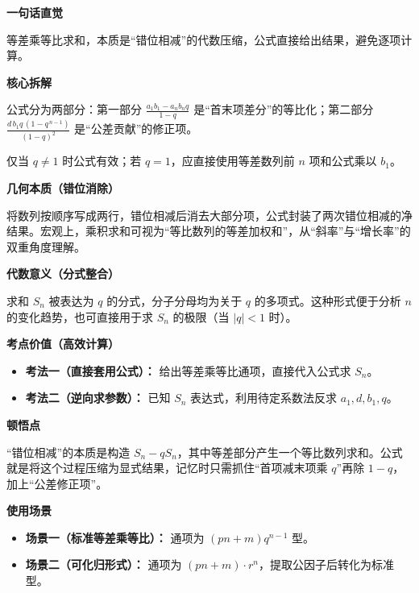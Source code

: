 \begin{explanationbox}
	\textbf{\textcolor{CExplanation}{一句话直觉}}

	等差乘等比求和，本质是“错位相减”的代数压缩，公式直接给出结果，避免逐项计算。

	\medskip
	\textbf{\textcolor{CExplanation}{核心拆解}}
	\begin{description}[style=nextline, leftmargin=2.8em, labelsep=0.5em, itemsep=0.45em]
		\item[\textbf{要点一（公式结构）：}] 公式分为两部分：第一部分 $\frac{a_1 b_1 - a_n b_n q}{1-q}$ 是“首末项差分”的等比化；第二部分 $\frac{d\,b_1 q\,(1-q^{\,n-1})}{(1-q)^2}$ 是“公差贡献”的修正项。
		\item[\textbf{要点二（适用范围）：}] 仅当 $q \neq 1$ 时公式有效；若 $q = 1$，应直接使用等差数列前 $n$ 项和公式乘以 $b_1$。
	\end{description}

	\medskip
	\textbf{\textcolor{CExplanation}{几何本质（错位消除）}}

	将数列按顺序写成两行，错位相减后消去大部分项，公式封装了两次错位相减的净结果。宏观上，乘积求和可视为“等比数列的等差加权和”，从“斜率”与“增长率”的双重角度理解。

	\medskip
	\textbf{\textcolor{CExplanation}{代数意义（分式整合）}}

	求和 $S_n$ 被表达为 $q$ 的分式，分子分母均为关于 $q$ 的多项式。这种形式便于分析 $n$ 的变化趋势，也可直接用于求 $S_n$ 的极限（当 $|q|<1$ 时）。

	\medskip
	\textbf{\textcolor{CExplanation}{考点价值（高效计算）}}
	\begin{itemize}[leftmargin=*, itemsep=0.5em, topsep=0.4em]
		\item \textbf{考法一（直接套用公式）：} 给出等差乘等比通项，直接代入公式求 $S_n$。
		\item \textbf{考法二（逆向求参数）：} 已知 $S_n$ 表达式，利用待定系数法反求 $a_1,d,b_1,q$。
	\end{itemize}

	\medskip
	\textbf{\textcolor{CExplanation}{顿悟点}}

	“错位相减”的本质是构造 $S_n - qS_n$，其中等差部分产生一个等比数列求和。公式就是将这个过程压缩为显式结果，记忆时只需抓住“首项减末项乘 $q$”再除 $1-q$，加上“公差修正项”。

	\medskip
	\textbf{\textcolor{CExplanation}{使用场景}}
	\begin{itemize}[leftmargin=*, itemsep=0.5em, topsep=0.4em]
		\item \textbf{场景一（标准等差乘等比）：} 通项为 $(pn + m)q^{n-1}$ 型。
		\item \textbf{场景二（可化归形式）：} 通项为 $(pn + m) \cdot r^{n}$，提取公因子后转化为标准型。
	\end{itemize}
\end{explanationbox}

